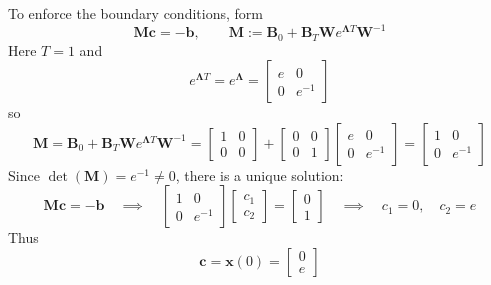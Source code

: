 \begin{exampleBox}
    To enforce the boundary conditions, form
    \begin{equation}
        \mathbf{M} \mathbf{c} = -\mathbf{b},\qquad
        \mathbf{M} := \mathbf{B}_0 + \mathbf{B}_T \mathbf{W} e^{\mathbf{\Lambda} T} \mathbf{W}^{-1}
    \end{equation}
    Here $T=1$ and
    \begin{equation}
        e^{\mathbf{\Lambda} T} = e^{\mathbf{\Lambda}} = 
    \begin{bmatrix}e & 0\\[4pt] 0 & e^{-1}\end{bmatrix}
    \end{equation}
    so
    \begin{equation}
        \mathbf{M} = \mathbf{B}_0 + \mathbf{B}_T \mathbf{W} e^{\mathbf{\Lambda} T} \mathbf{W}^{-1}
        = \begin{bmatrix}1 & 0\\[4pt] 0 & 0\end{bmatrix}
        + \begin{bmatrix}0 & 0\\[4pt] 0 & 1\end{bmatrix}
        \begin{bmatrix}e & 0\\[4pt] 0 & e^{-1}\end{bmatrix}
        = \begin{bmatrix}1 & 0\\[4pt] 0 & e^{-1}\end{bmatrix}
    \end{equation}
    Since $\det(\mathbf{M}) = e^{-1} \neq 0$, there is a unique solution:
    \begin{equation}
        \mathbf{M}\mathbf{c} = -\mathbf{b}
        \quad\implies\quad
        \begin{bmatrix}1 & 0\\[4pt] 0 & e^{-1}\end{bmatrix}
        \begin{bmatrix}c_1\\[4pt] c_2\end{bmatrix}
        =
        \begin{bmatrix}0\\[4pt] 1\end{bmatrix}
        \quad\implies\quad
        c_1 = 0,\quad c_2 = e
    \end{equation}
    Thus
    \begin{equation}
        \mathbf{c} = \mathbf{x}(0) =
        \begin{bmatrix}0\\[4pt] e\end{bmatrix}

\end{equation}
\end{exampleBox}
